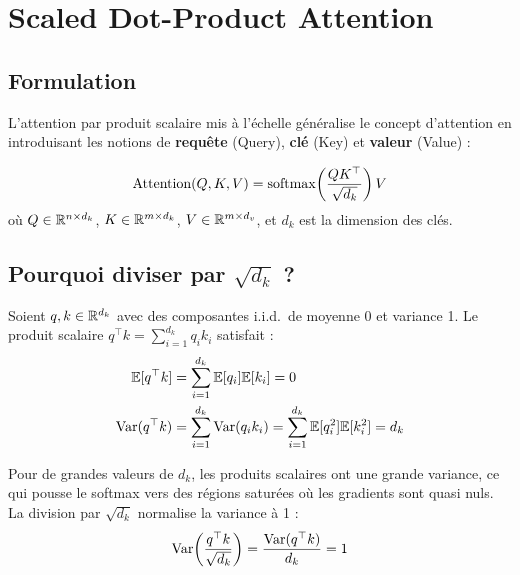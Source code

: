 \section{Scaled Dot-Product Attention}
\label{sec:scaled-attention}

\subsection{Formulation}

L'attention par produit scalaire mis \`a l'\'echelle
\cite{vaswani2017attention} g\'en\'eralise le concept d'attention en
introduisant les notions de \textbf{requ\^ete} (Query), \textbf{cl\'e} (Key)
et \textbf{valeur} (Value) :

\begin{formules}[title=\textbf{Scaled Dot-Product Attention}]
\begin{equation}
\text{Attention}(Q, K, V) = \mathrm{softmax}\!\left(\frac{Q K^\top}{\sqrt{d_k}}\right) V
\label{eq:scaled-attention}
\end{equation}
o\`u $Q \in \mathbb{R}^{n \times d_k}$, $K \in \mathbb{R}^{m \times d_k}$,
$V \in \mathbb{R}^{m \times d_v}$, et $d_k$ est la dimension des cl\'es.
\end{formules}

\subsection{Pourquoi diviser par $\sqrt{d_k}$ ?}

\begin{theoreme}
\label{thm:scaling}
Soient $q, k \in \mathbb{R}^{d_k}$ avec des composantes i.i.d.\ de moyenne 0 et
variance 1. Le produit scalaire $q^\top k = \sum_{i=1}^{d_k} q_i k_i$
satisfait :
\begin{align}
\mathbb{E}[q^\top k] &= \sum_{i=1}^{d_k} \mathbb{E}[q_i] \mathbb{E}[k_i] = 0 \\
\mathrm{Var}(q^\top k) &= \sum_{i=1}^{d_k} \mathrm{Var}(q_i k_i)
= \sum_{i=1}^{d_k} \mathbb{E}[q_i^2]\mathbb{E}[k_i^2] = d_k
\end{align}

Pour de grandes valeurs de $d_k$, les produits scalaires ont une grande
variance, ce qui pousse le softmax vers des r\'egions satur\'ees o\`u les
gradients sont quasi nuls. La division par $\sqrt{d_k}$ normalise la
variance \`a 1 :
\begin{equation}
\mathrm{Var}\!\left(\frac{q^\top k}{\sqrt{d_k}}\right)
= \frac{\mathrm{Var}(q^\top k)}{d_k} = 1
\end{equation}
\end{theoreme}

